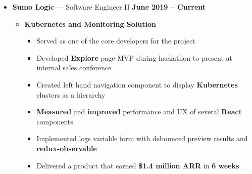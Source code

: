 \documentclass[10pt, oneside]{letter}
\begin{document}
    \begin{adjustwidth}{0.1in}{0pt}

      \begin{itemize}
        \item
          \textbf{Sumo Logic} --- Software Engineer II \hfill \textbf{June 2019 -- Current}
            \begin{itemize}
              \item{\textbf{Kubernetes and Monitoring Solution}}
                \begin{itemize}
                  \item Served as one of the core developers for the project
                  \item {
                      Developed \textbf{Explore} page MVP during hackathon to
                      present at internal sales conference
                  }
                  \item {
                      Created left hand navigation component to display
                      \textbf{Kubernetes} clusters as a hierarchy
                  }
                  \item {
                      \textbf{Measured} and \textbf{improved} performance and
                      UX of several \textbf{React} components
                  }
                  \item {
                      Implemented logs variable form with debounced preview
                      results and \textbf{redux-observable}
                  }
                  \item {
                      Delivered a product that earned \textbf{\$1.4 million
                        ARR} in \textbf{6 weeks}
                  }
                \end{itemize}


\end{itemize}
\end{itemize}
\end{adjustwidth}
\end{document}
